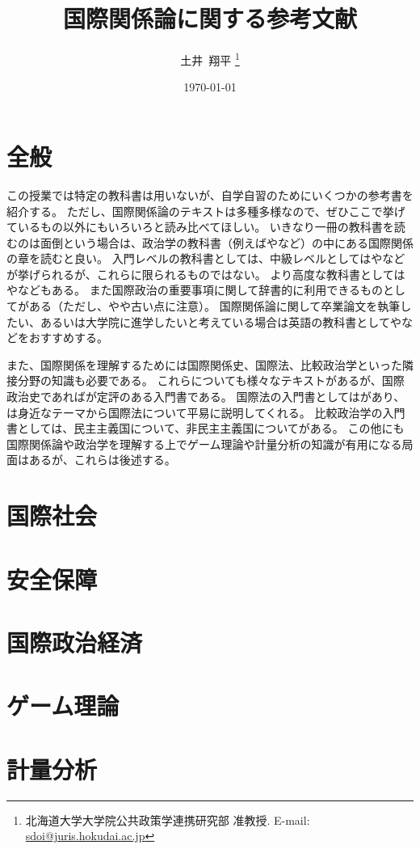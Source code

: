 \documentclass[hidelinks,a4paper]{jlreq}
\title{
    国際関係論に関する参考文献
}
\date{\today}
\author{
  土井~翔平
  \thanks{
    北海道大学大学院公共政策学連携研究部 准教授. 
    E-mail: \href{mailto:sdoi@juris.hokudai.ac.jp}{sdoi@juris.hokudai.ac.jp}
  }
}
\begin{document}
\maketitle

\section{全般}

この授業では特定の教科書は用いないが、自学自習のためにいくつかの参考書を紹介する。
ただし、国際関係論のテキストは多種多様なので、ぜひここで挙げているもの以外にもいろいろと読み比べてほしい。
いきなり一冊の教科書を読むのは面倒という場合は、政治学の教科書（例えば\citet{sunahara2020}や\citet{sakamoto2020}など）の中にある国際関係の章を読むと良い。
入門レベルの教科書としては\citet{murata2023}、中級レベルとしては\citet{kusano2023}や\citet{tago2024}などが挙げられるが、これらに限られるものではない。
より高度な教科書としては\citet{nakanishi2013}や\citet{yamakage2012}などもある。
また国際政治の重要事項に関して辞書的に利用できるものとして\citet{tanaka2010}がある（ただし、やや古い点に注意）。
国際関係論に関して卒業論文を執筆したい、あるいは大学院に進学したいと考えている場合は英語の教科書として\citet{frieden2019}や\citet{baylis2026}などをおすすめする。

また、国際関係を理解するためには国際関係史、国際法、比較政治学といった隣接分野の知識も必要である。
これらについても様々なテキストがあるが、国際政治史であれば\citet{ogawa2018}が定評のある入門書である。
国際法の入門書としては\citet{tamada2022}があり、\citet{kitamura2025}は身近なテーマから国際法について平易に説明してくれる。
比較政治学の入門書としては、民主主義国について\citet{ito2025}、非民主主義国について\citet{kubo2025}がある。
この他にも国際関係論や政治学を理解する上でゲーム理論や計量分析の知識が有用になる局面はあるが、これらは後述する。

\section{国際社会}

\section{安全保障}

\section{国際政治経済}

\section{ゲーム理論}

\section{計量分析}



\end{document}
